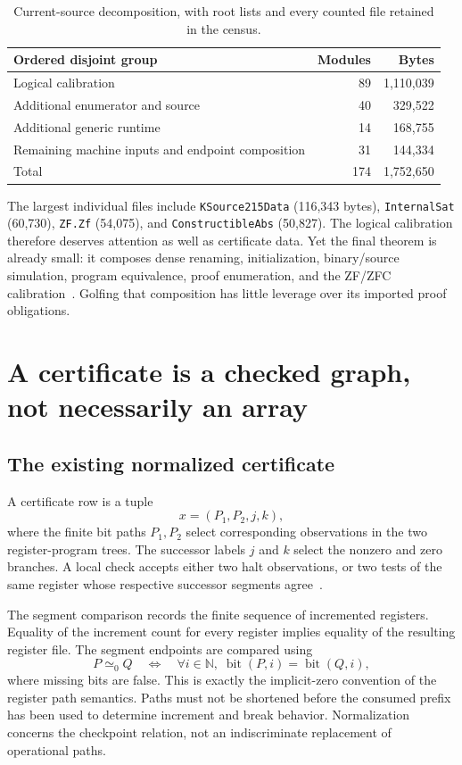 \documentclass[11pt]{article}
\theoremstyle{remark}\newtheorem{remark}[theorem]{Remark}
\newcommand{\N}{\mathbb N}
\newcommand{\ipeq}{\mathrel{\simeq_0}}
\newcommand{\code}[1]{\texttt{\small #1}}
\begin{document}
\begin{table}[ht]
\centering
\begin{tabularx}{\textwidth}{Xrr}
\toprule
Ordered disjoint group & Modules & Bytes\\
\midrule
Logical calibration & 89 & 1,110,039\\
Additional enumerator and source & 40 & 329,522\\
Additional generic runtime & 14 & 168,755\\
Remaining machine inputs and endpoint composition & 31 & 144,334\\
\midrule
Total & 174 & 1,752,650\\
\bottomrule
\end{tabularx}
\caption{Current-source decomposition, with root lists and every counted file retained in the census.}
\end{table}

The largest individual files include \code{KSource215Data} (116,343 bytes), \code{InternalSat} (60,730), \code{ZF.Zf} (54,075), and \code{ConstructibleAbs} (50,827). The logical calibration therefore deserves attention as well as certificate data. Yet the final theorem is already small: it composes dense renaming, initialization, binary/source simulation, program equivalence, proof enumeration, and the ZF/ZFC calibration~\cite{endpoint,endpointshared}. Golfing that composition has little leverage over its imported proof obligations.

\section{A certificate is a checked graph, not necessarily an array}

\subsection{The existing normalized certificate}
A certificate row is a tuple
\[
  x=(P_1,P_2,j,k),
\]
where the finite bit paths $P_1,P_2$ select corresponding observations in the two register-program trees. The successor labels $j$ and $k$ select the nonzero and zero branches. A local check accepts either two halt observations, or two tests of the same register whose respective successor segments agree~\cite{normalized}.

The segment comparison records the finite sequence of incremented registers. Equality of the increment count for every register implies equality of the resulting register file. The segment endpoints are compared using
\[
 P\ipeq Q\quad\Longleftrightarrow\quad
 \forall i\in\N,\;\operatorname{bit}(P,i)=\operatorname{bit}(Q,i),
\]
where missing bits are false. This is exactly the implicit-zero convention of the register path semantics. Paths must not be shortened before the consumed prefix has been used to determine increment and break behavior. Normalization concerns the checkpoint relation, not an indiscriminate replacement of operational paths.
\end{document}

